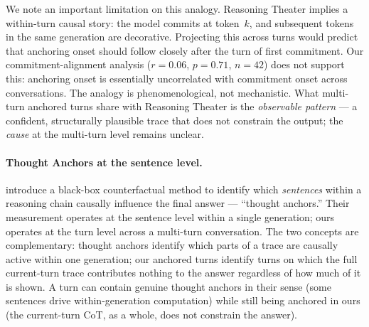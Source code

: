 \documentclass{article}
\begin{document}
We note an important limitation on this analogy.
Reasoning Theater implies a within-turn causal story: the model
commits at token~$k$, and subsequent tokens in the same generation
are decorative.
Projecting this across turns would predict that anchoring onset
should follow closely after the turn of first commitment.
Our commitment-alignment analysis ($r = 0.06$, $p = 0.71$,
$n = 42$) does not support this: anchoring onset is essentially
uncorrelated with commitment onset across conversations.
The analogy is phenomenological, not mechanistic.
What multi-turn anchored turns share with Reasoning Theater
is the \emph{observable pattern} --- a confident, structurally
plausible trace that does not constrain the output; the
\emph{cause} at the multi-turn level remains unclear.

\paragraph{Thought Anchors at the sentence level.}
\citet{thought_anchors2026} introduce a black-box counterfactual
method to identify which \emph{sentences} within a reasoning chain
causally influence the final answer --- ``thought anchors.''
Their measurement operates at the sentence level within a single
generation; ours operates at the turn level across a multi-turn
conversation.
The two concepts are complementary: thought anchors identify which
parts of a trace are causally active within one generation; our
anchored turns identify turns on which the full current-turn trace
contributes nothing to the answer regardless of how much of it is
shown.
A turn can contain genuine thought anchors in their sense (some
sentences drive within-generation computation) while still being
anchored in ours (the current-turn CoT, as a whole, does not
constrain the answer).
\end{document}
